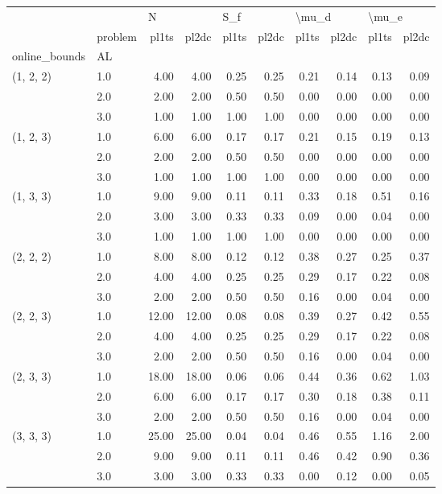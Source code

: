 \begin{tabular}{llrrrrrrrr}
\toprule
          & {} & \multicolumn{2}{l}{N} & \multicolumn{2}{l}{S\_f} & \multicolumn{2}{l}{\textbackslash mu\_d} & \multicolumn{2}{l}{\textbackslash mu\_e} \\
          & problem & pl1ts & pl2dc & pl1ts & pl2dc & pl1ts & pl2dc & pl1ts & pl2dc \\
online\_bounds & AL &       &       &       &       &       &       &       &       \\
\midrule
(1, 2, 2) & 1.0 &  4.00 &  4.00 &  0.25 &  0.25 &  0.21 &  0.14 &  0.13 &  0.09 \\
          & 2.0 &  2.00 &  2.00 &  0.50 &  0.50 &  0.00 &  0.00 &  0.00 &  0.00 \\
          & 3.0 &  1.00 &  1.00 &  1.00 &  1.00 &  0.00 &  0.00 &  0.00 &  0.00 \\
(1, 2, 3) & 1.0 &  6.00 &  6.00 &  0.17 &  0.17 &  0.21 &  0.15 &  0.19 &  0.13 \\
          & 2.0 &  2.00 &  2.00 &  0.50 &  0.50 &  0.00 &  0.00 &  0.00 &  0.00 \\
          & 3.0 &  1.00 &  1.00 &  1.00 &  1.00 &  0.00 &  0.00 &  0.00 &  0.00 \\
(1, 3, 3) & 1.0 &  9.00 &  9.00 &  0.11 &  0.11 &  0.33 &  0.18 &  0.51 &  0.16 \\
          & 2.0 &  3.00 &  3.00 &  0.33 &  0.33 &  0.09 &  0.00 &  0.04 &  0.00 \\
          & 3.0 &  1.00 &  1.00 &  1.00 &  1.00 &  0.00 &  0.00 &  0.00 &  0.00 \\
(2, 2, 2) & 1.0 &  8.00 &  8.00 &  0.12 &  0.12 &  0.38 &  0.27 &  0.25 &  0.37 \\
          & 2.0 &  4.00 &  4.00 &  0.25 &  0.25 &  0.29 &  0.17 &  0.22 &  0.08 \\
          & 3.0 &  2.00 &  2.00 &  0.50 &  0.50 &  0.16 &  0.00 &  0.04 &  0.00 \\
(2, 2, 3) & 1.0 & 12.00 & 12.00 &  0.08 &  0.08 &  0.39 &  0.27 &  0.42 &  0.55 \\
          & 2.0 &  4.00 &  4.00 &  0.25 &  0.25 &  0.29 &  0.17 &  0.22 &  0.08 \\
          & 3.0 &  2.00 &  2.00 &  0.50 &  0.50 &  0.16 &  0.00 &  0.04 &  0.00 \\
(2, 3, 3) & 1.0 & 18.00 & 18.00 &  0.06 &  0.06 &  0.44 &  0.36 &  0.62 &  1.03 \\
          & 2.0 &  6.00 &  6.00 &  0.17 &  0.17 &  0.30 &  0.18 &  0.38 &  0.11 \\
          & 3.0 &  2.00 &  2.00 &  0.50 &  0.50 &  0.16 &  0.00 &  0.04 &  0.00 \\
(3, 3, 3) & 1.0 & 25.00 & 25.00 &  0.04 &  0.04 &  0.46 &  0.55 &  1.16 &  2.00 \\
          & 2.0 &  9.00 &  9.00 &  0.11 &  0.11 &  0.46 &  0.42 &  0.90 &  0.36 \\
          & 3.0 &  3.00 &  3.00 &  0.33 &  0.33 &  0.00 &  0.12 &  0.00 &  0.05 \\
\bottomrule
\end{tabular}
